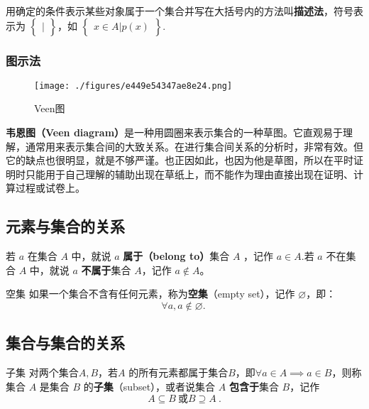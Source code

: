 用确定的条件表示某些对象属于一个集合并写在大括号内的方法叫\textbf{描述法}，符号表示为 $\begin{Bmatrix} | \end{Bmatrix}$，如 $\begin{Bmatrix} x\in A|p(x) \end{Bmatrix}$.

\subsubsection{图示法}

\begin{figure}[ht]
\centering
\texttt{[image: ./figures/e449e54347ae8e24.png]}
\caption{Veen图} \label{fig_SufCnd_1}
\end{figure}

\textbf{韦恩图（Veen diagram）}是一种用圆圈来表示集合的一种草图。它直观易于理解，通常用来表示集合间的大致关系。在进行集合间关系的分析时，非常有效。但它的缺点也很明显，就是不够严谨。也正因如此，也因为他是草图，所以在平时证明时只能用于自己理解的辅助出现在草纸上，而不能作为理由直接出现在证明、计算过程或试卷上。


\subsection{元素与集合的关系}

若 $a$ 在集合 $A$ 中，就说 $a$ \textbf{属于（belong to）}集合 $A$ ，记作 $a \in A$.若 $a$ 不在集合 $A$ 中，就说 $a$ \textbf{不属于}集合 $A$，记作 $a\notin A$。


\begin{definition}{空集}
如果一个集合不含有任何元素，称为\textbf{空集}（empty set），记作 $\varnothing$，即：
\begin{equation}
\forall a,a\notin\varnothing.~
\end{equation}

\end{definition}

\subsection{集合与集合的关系}

\begin{definition}{子集}
对两个集合$A,B$，若$A$ 的所有元素都属于集合$B$，即$\forall a\in A\implies a\in B$，则称集合 $A$ 是集合 $B$ 的\textbf{子集}（subset），或者说集合 $A$ \textbf{包含于}集合 $B$，记作
\begin{equation}
A \subseteq B~\text{或}B \supseteq A~.
\end{equation}
\end{definition}

